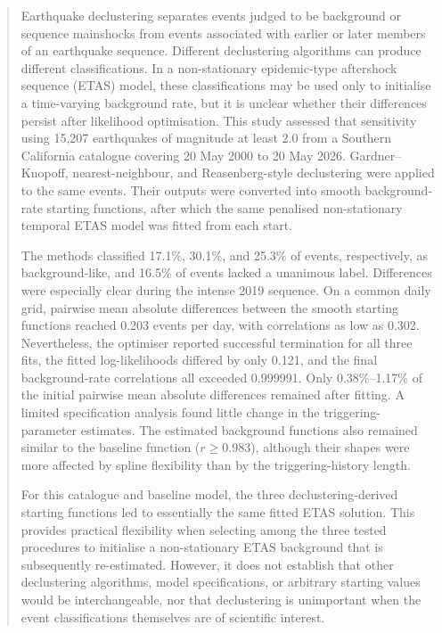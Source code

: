 
\begin{abstract}
Earthquake declustering separates events judged to be background or sequence
mainshocks from events associated with earlier or later members of an
earthquake sequence. Different declustering algorithms can produce different
classifications. In a non-stationary epidemic-type aftershock sequence (ETAS)
model, these classifications may be used only to initialise a time-varying
background rate, but it is unclear whether their differences persist after
likelihood optimisation. This study assessed that sensitivity using 15,207
earthquakes of magnitude at least 2.0 from a Southern California catalogue
covering 20 May 2000 to 20 May 2026. Gardner--Knopoff, nearest-neighbour, and
Reasenberg-style declustering were applied to the same events. Their outputs
were converted into smooth background-rate starting functions, after which the
same penalised non-stationary temporal ETAS model was fitted from each start.

The methods classified 17.1\%, 30.1\%, and 25.3\% of events, respectively, as
background-like, and 16.5\% of events lacked a unanimous label. Differences
were especially clear during the intense 2019 sequence. On a common daily
grid, pairwise mean absolute differences between the smooth starting functions
reached 0.203 events per day, with correlations as low as 0.302. Nevertheless,
the optimiser reported successful termination for all three fits, the fitted
log-likelihoods differed by only 0.121, and the final background-rate
correlations all exceeded 0.999991. Only 0.38\%--1.17\% of the initial pairwise
mean absolute differences remained after fitting. A limited specification
analysis found little change in the triggering-parameter estimates. The
estimated background functions also remained similar to the baseline function
($r\geq0.983$), although their shapes were more affected by spline flexibility
than by the triggering-history length.

For this catalogue and baseline model, the three declustering-derived starting
functions led to essentially the same fitted ETAS solution. This provides
practical flexibility when selecting among the three tested procedures to
initialise a non-stationary ETAS background that is subsequently re-estimated.
However, it does not establish that other declustering algorithms, model
specifications, or arbitrary starting values would be interchangeable, nor
that declustering is unimportant when the event classifications themselves are
of scientific interest.
\end{abstract}

